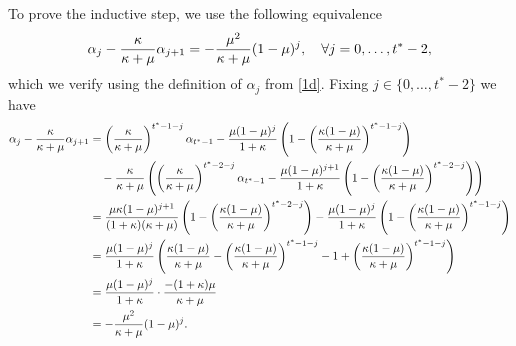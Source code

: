     To prove the inductive step, we use the following equivalence
    \begin{equation}
    \label{eqn-proof: AdvTheoremAlphaDifference}
        \alpha_j - \frac{\kappa}{\kappa+\mu}\alpha_{j+1} = - \frac{\mu^2}{\kappa+\mu} (1-\mu)^j, \quad \forall j = 0, \ldots, t^*-2,
    \end{equation}
    which we verify using the definition of $\alpha_j$ from \eqref{1d}. Fixing $j \in \{0, \ldots, t^*-2\}$ we have 
    \begin{align*}
        \alpha_j - \frac{\kappa}{\kappa+\mu}\alpha_{j+1} &= \left(\frac{\kappa}{\kappa+\mu}\right)^{t^* - 1 - j} \alpha_{t^* -1} - \frac{\mu (1-\mu)^{j}}{ 1+ \kappa} \left( 1 - \left( \frac{\kappa(1-\mu)}{\kappa +\mu} \right)^{t^* - 1 - j} \right)\\
        &\quad - \frac{\kappa}{\kappa+\mu} \left( \left(\frac{\kappa}{\kappa+\mu}\right)^{t^* - 2 - j} \alpha_{t^* -1} - \frac{\mu (1-\mu)^{j+1}}{ 1+ \kappa} \left( 1 - \left( \frac{\kappa(1-\mu)}{\kappa +\mu} \right)^{t^* - 2 - j} \right)\right)\\
        &=   \frac{\mu \kappa (1-\mu)^{j+
        1}}{(1+\kappa) (\kappa+\mu)} \left( 1 - \left( \frac{\kappa(1-\mu)}{\kappa+\mu} \right)^{t^* - 2 - j} \right)  - \frac{\mu (1-\mu)^{j}}{1+ \kappa} \left( 1 - \left( \frac{\kappa(1-\mu)}{\kappa+\mu} \right)^{t^* - 1 - j} \right) \\
        &= \frac{\mu(1-\mu)^j}{1+\kappa} \left( \frac{\kappa(1-\mu)}{\kappa+\mu} - \left( \frac{\kappa(1-\mu)}{\kappa+\mu} \right)^{t^* - 1 - j} - 1 + \left( \frac{\kappa(1-\mu)}{\kappa+\mu} \right)^{t^* - 1 - j}\right)\\
        &= \frac{\mu(1-\mu)^j}{1+\kappa} \cdot \frac{-(1+\kappa)\mu}{\kappa+\mu}\\
        &= -\frac{\mu^2}{\kappa+\mu} (1-\mu)^j.
    \end{align*}
    
